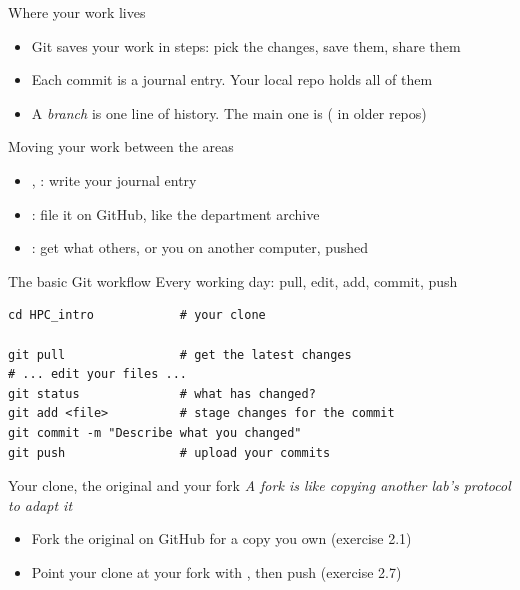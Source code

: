 \begin{frame}{Where your work lives}

\bigskip
\begin{itemize}
    \item Git saves your work in steps: pick the changes, save them, share them
    \item Each commit is a journal entry. Your local repo holds all of them
    \item A \emph{branch} is one line of history. The main one is 
          ( in older repos)
\end{itemize}
\end{frame}

\begin{frame}{Moving your work between the areas}

\medskip
\begin{itemize}
    \item {}, : write your journal entry
    \item {}: file it on GitHub, like the department archive
    \item {}: get what others, or you on another computer, pushed
\end{itemize}
\end{frame}

\begin{frame}[fragile]{The basic Git workflow}
Every working day: pull, edit, add, commit, push
\begin{lstlisting}
cd HPC_intro            # your clone

git pull                # get the latest changes
# ... edit your files ...
git status              # what has changed?
git add <file>          # stage changes for the commit
git commit -m "Describe what you changed"
git push                # upload your commits
\end{lstlisting}
\end{frame}

\begin{frame}{Your clone, the original and your fork}
\emph{A fork is like copying another lab's protocol to adapt it}

\smallskip
{}

\medskip
\begin{itemize}
    \item Fork the original on GitHub for a copy you own (exercise 2.1)
    \item Point your clone at your fork with , then push (exercise 2.7)
\end{itemize}
\end{frame}

